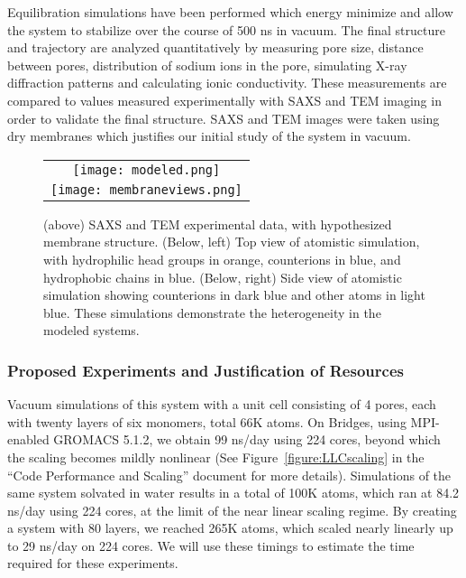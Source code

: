 Equilibration simulations have been performed which energy minimize and
allow the system to stabilize over the course of 500 ns in vacuum.  The
final structure and trajectory are analyzed quantitatively by
measuring pore size, distance between pores, distribution of
sodium ions in the pore, simulating X-ray diffraction patterns and 
calculating ionic conductivity. These measurements are compared to values
measured experimentally with SAXS and TEM imaging in order to validate
the final structure. SAXS and TEM images were taken using dry membranes
which justifies our initial study of the system in vacuum.

\begin{figure}[h]
\begin{center}
\begin{tabular}{c}
\texttt{[image: modeled.png]}\\
\texttt{[image: membraneviews.png]}\\
\end{tabular}
\end{center}
\caption{(above) SAXS and TEM experimental data, with hypothesized
  membrane structure. (Below, left) Top view of atomistic simulation,
  with hydrophilic head groups in orange, counterions in blue, and
  hydrophobic chains in blue. (Below, right) Side view of atomistic
  simulation showing counterions in dark blue and other atoms in light
  blue. These simulations demonstrate the heterogeneity in the
  modeled systems.~\label{figure:membrane}}
\end{figure}

\subsubsection*{Proposed Experiments and Justification of Resources}

Vacuum simulations of this system with a unit cell consisting of 4
pores, each with twenty layers of six monomers, total 66K atoms. On
Bridges, using MPI-enabled GROMACS 5.1.2, we obtain
99 ns/day using 224 cores, beyond which the scaling becomes mildly
nonlinear (See Figure~\ref{figure:LLCscaling} in the ``Code Performance
and Scaling'' document for more details). Simulations of the same
system solvated in water results in a total of 100K atoms, which ran
at 84.2 ns/day using 224 cores, at the limit of the near linear scaling
regime.  By creating a system with 80 layers, we reached 265K atoms,
which scaled nearly linearly up to 29 ns/day on 224 cores. We will use
these timings to estimate the time required for these experiments.

